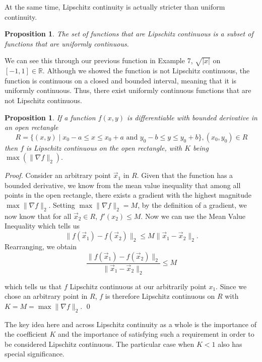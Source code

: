 \documentclass{article}
\newtheorem{proposition}[theorem]{Proposition}
\theoremstyle{remark}
\begin{document}
At the same time, Lipschitz continuity is actually stricter than uniform continuity. \\

\begin{proposition}

The set of functions that are Lipschitz continuous is a subset of functions that are uniformly continuous.
\end{proposition}

We can see this through our previous function in Example 7,  $\sqrt{|x|}$ on $[-1,1] \in \mathbb{R}$. Although we showed the function is not Lipschitz continuous, the function is continuous on a closed and bounded interval, meaning that it is uniformly continuous. Thus, there exist uniformly continuous functions that are not Lipschitz continuous.\\

\begin{proposition}
    If a function $f(x,y)$ is differentiable with bounded derivative in an open rectangle
    $$R = \{(x,y)\mid x_0-a\leq x \leq x_0+a \text{ and } y_0-b\leq y\leq y_0+b\}, (x_0, y_0) \in R$$
    then $f$ is Lipschitz continuous on the open rectangle, with $K$ being $\max(\|\nabla f\|_2).$
\end{proposition}
\begin{proof}
Consider an arbitrary point $\vec x_1$ in $R$. Given that the function has a bounded derivative, we know from the mean value inequality that among all points in the open rectangle, there exists a gradient with the highest magnitude $\max {\|\nabla f\|_2}$. Setting $\max {\|\nabla f\|_2} = M$, by the definition of a gradient, we now know that for all $\vec x_2 \in R$, $f'(x_2)\leq M$. Now we can use the Mean Value Inequality which tells us  
$$\|f(\vec x_1) - f(\vec x_2)\|_2 \leq M\|\vec x_1 - \vec x_2\|_2.$$ 
Rearranging, we obtain
$$\frac{\|f(\vec x_1) - f(\vec x_2)\|_2}{\|\vec x_1 - \vec x_2\|_2} \leq M$$

which tells us that $f$ Lipschitz continuous at our arbitrarily point $x_1$. Since we chose an arbitrary point in $R$, $f$ is therefore Lipschitz continuous on $R$ with $K=M= \max {\|\nabla f\|_2}$.
\qed
\phantom\qedhere
\end{proof}


The key idea here and across Lipschitz continuity as a whole is the importance of the coefficient $K$ and the importance of satisfying such a requirement in order to be considered Lipschitz continuous. The particular case when $K < 1$ also has special significance. \\
\end{document}
